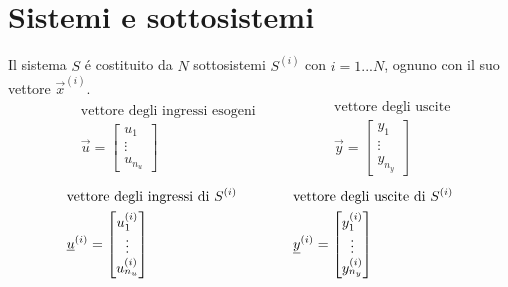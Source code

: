 \documentclass[../main.tex]{subfiles}
\begin{document}
	\section{Sistemi e sottosistemi}
		Il sistema $ S $ \'e costituito da $ N $ sottosistemi $ S^{(i)} $ con $ i = 1...N $, ognuno con il suo vettore $ \vec x^{(i)} $.
		\[
			\begin{aligned}
				&\text{vettore degli ingressi esogeni}
				\\
				&\vec u =
				\begin{bmatrix}
					u_1\\
					\vdots\\
					u_{n_u}
				\end{bmatrix}
			\end{aligned}
			\qquad\qquad
			\begin{aligned}
				&\text{vettore degli uscite}
				\\
				&\vec y =
				\begin{bmatrix}
					y_1\\
					\vdots\\
					y_{n_y}
				\end{bmatrix}
			\end{aligned}
		\]
		\[
			\begin{aligned}
				&\text{vettore degli ingressi di $ S^{(i)} $}
				\\
				&\vec u^{(i)} =
				\begin{bmatrix}
					u^{(i)}_1\\
					\vdots\\
					u^{(i)}_{n_u}
				\end{bmatrix}
			\end{aligned}
			\qquad\qquad
			\begin{aligned}
				&\text{vettore degli uscite di $ S^{(i)} $}
				\\
				&\vec y^{(i)} =
				\begin{bmatrix}
					y^{(i)}_1\\
					\vdots\\
					y^{(i)}_{n_y}
				\end{bmatrix}
			\end{aligned}
		\]
	
\end{document}
